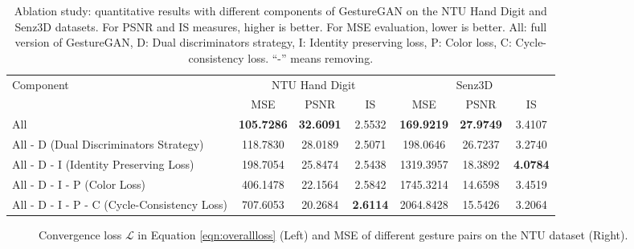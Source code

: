 \documentclass[sigconf]{acmart}
\begin{document}
\begin{table*}[!t] \small
	\centering
	\vspace{-0.2cm}
	\caption{Ablation study: quantitative results with different components of GestureGAN on the NTU Hand Digit and Senz3D datasets. For PSNR and IS measures, higher is better. For MSE evaluation, lower is better.  All: full version of GestureGAN, D: Dual discriminators strategy, I: Identity preserving loss, P: Color loss, C: Cycle-consistency loss. ``-'' means removing.}
	\begin{tabular}{l|c|c|c|c|c|c} \toprule
		\multirow{2}{*}{Component} & \multicolumn{3}{c|}{NTU Hand Digit \cite{liu2016deepfashion}}& \multicolumn{3}{c}{Senz3D \cite{memo2016head}}   \\ \cline{2-7}
		& MSE      & PSNR    & IS                            & MSE       & PSNR    & IS       \\ \midrule	
		All	                                  & \textbf{105.7286}  & \textbf{32.6091} &2.5532      & \textbf{169.9219} & \textbf{27.9749}          & 3.4107 \\ \hline
		All - D (Dual Discriminators Strategy)         & 118.7830 & 28.0189 & 2.5071                        & 198.0646  & 26.7237 & 3.2740 \\ \hline	
		All - D - I (Identity Preserving Loss)           & 198.7054 & 25.8474 & 2.5438                        & 1319.3957 & 18.3892 & \textbf{4.0784} \\ \hline
		All - D - I - P (Color Loss)          & 406.1478 & 22.1564 & 2.5842                        & 1745.3214 & 14.6598 & 3.4519 \\ \hline 
		All - D - I - P - C (Cycle-Consistency Loss)      & 707.6053 & 20.2684 & \textbf{2.6114}               & 2064.8428 & 15.5426 & 3.2064  \\ \hline	
	\end{tabular}
	\label{tab:result}
	\vspace{-0.2cm}
\end{table*}

\begin{figure}[!t] \tiny
	\centering
	\setcounter{subfigure}{0}
	\caption{Convergence loss $\mathcal{L}$ in Equation \ref{eqn:overallloss} (Left) and MSE of different gesture pairs on the NTU dataset (Right).}	
	\label{fig:plot_loss_change}
	\vspace{-0.4cm}
\end{figure}
\end{document}
